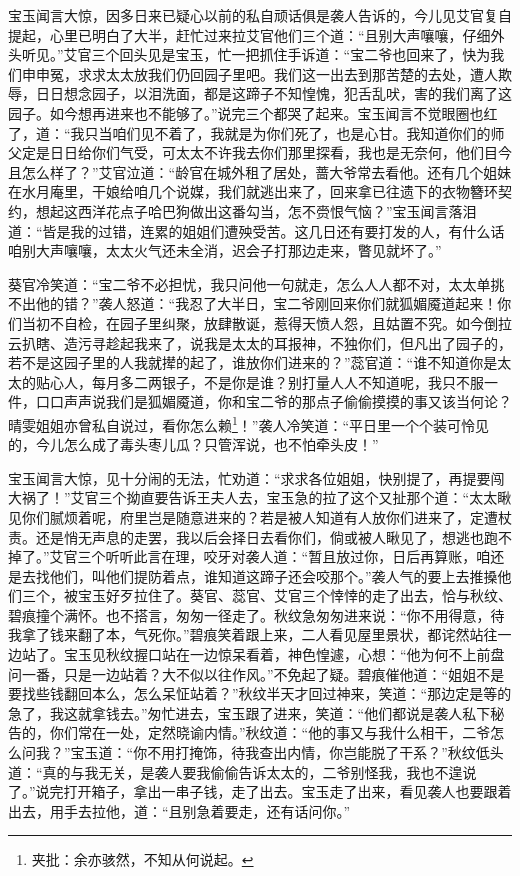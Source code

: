 \documentclass[12pt,oneside]{book}
\begin{document}
宝玉闻言大惊，因多日来已疑心以前的私自顽话俱是袭人告诉的，今儿见艾官复自提起，心里已明白了大半，赶忙过来拉艾官他们三个道：“且别大声嚷嚷，仔细外头听见。”艾官三个回头见是宝玉，忙一把抓住手诉道：“宝二爷也回来了，快为我们申申冤，求求太太放我们仍回园子里吧。我们这一出去到那苦楚的去处，遭人欺辱，日日想念园子，以泪洗面，都是这蹄子不知惶愧，犯舌乱吠，害的我们离了这园子。如今想再进来也不能够了。”说完三个都哭了起来。宝玉闻言不觉眼圈也红了，道：“我只当咱们见不着了，我就是为你们死了，也是心甘。我知道你们的师父定是日日给你们气受，可太太不许我去你们那里探看，我也是无奈何，他们目今且怎么样了？”艾官泣道：“龄官在城外租了居处，蔷大爷常去看他。还有几个姐妹在水月庵里，干娘给咱几个说媒，我们就逃出来了，回来拿已往遗下的衣物簪环契约，想起这西洋花点子哈巴狗做出这番勾当，怎不赍恨气恼？”宝玉闻言落泪道：“皆是我的过错，连累的姐姐们遭殃受苦。这几日还有要打发的人，有什么话咱别大声嚷嚷，太太火气还未全消，迟会子打那边走来，瞥见就坏了。”

葵官冷笑道：“宝二爷不必担忧，我只问他一句就走，怎么人人都不对，太太单挑不出他的错？”袭人怒道：“我忍了大半日，宝二爷刚回来你们就狐媚魇道起来！你们当初不自检，在园子里纠聚，放肆散诞，惹得天愤人怨，且姑置不究。如今倒拉云扒瞎、造污寻趁起我来了，说我是太太的耳报神，不独你们，但凡出了园子的，若不是这园子里的人我就撵的起了，谁放你们进来的？”蕊官道：“谁不知道你是太太的贴心人，每月多二两银子，不是你是谁？别打量人人不知道呢，我只不服一件，口口声声说我们是狐媚魇道，你和宝二爷的那点子偷偷摸摸的事又该当何论？晴雯姐姐亦曾私自说过，看你怎么赖\footnote{夹批：余亦骇然，不知从何说起。}！”袭人冷笑道：“平日里一个个装可怜见的，今儿怎么成了毒头枣儿瓜？只管浑说，也不怕牵头皮！”

宝玉闻言大惊，见十分闹的无法，忙劝道：“求求各位姐姐，快别提了，再提要闯大祸了！”艾官三个拗直要告诉王夫人去，宝玉急的拉了这个又扯那个道：“太太瞅见你们腻烦着呢，府里岂是随意进来的？若是被人知道有人放你们进来了，定遭杖责。还是悄无声息的走罢，我以后会择日去看你们，倘或被人瞅见了，想逃也跑不掉了。”艾官三个听听此言在理，咬牙对袭人道：“暂且放过你，日后再算账，咱还是去找他们，叫他们提防着点，谁知道这蹄子还会咬那个。”袭人气的要上去推搡他们三个，被宝玉好歹拉住了。葵官、蕊官、艾官三个悻悻的走了出去，恰与秋纹、碧痕撞个满怀。也不搭言，匆匆一径走了。秋纹急匆匆进来说：“你不用得意，待我拿了钱来翻了本，气死你。”碧痕笑着跟上来，二人看见屋里景状，都诧然站往一边站了。宝玉见秋纹握口站在一边惊呆看着，神色惶遽，心想：“他为何不上前盘问一番，只是一边站着？大不似以往作风。”不免起了疑。碧痕催他道：“姐姐不是要找些钱翻回本么，怎么呆怔站着？”秋纹半天才回过神来，笑道：“那边定是等的急了，我这就拿钱去。”匆忙进去，宝玉跟了进来，笑道：“他们都说是袭人私下秘告的，你们常在一处，定然晓谕内情。”秋纹道：“他的事又与我什么相干，二爷怎么问我？”宝玉道：“你不用打掩饰，待我查出内情，你岂能脱了干系？”秋纹低头道：“真的与我无关，是袭人要我偷偷告诉太太的，二爷别怪我，我也不遑说了。”说完打开箱子，拿出一串子钱，走了出去。宝玉走了出来，看见袭人也要跟着出去，用手去拉他，道：“且别急着要走，还有话问你。”
\end{document}
